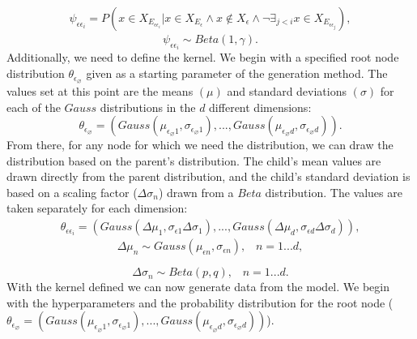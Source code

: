 \documentclass{article}
\begin{document}
%
\begin{equation}
\begin{multlined}
\psi_{\epsilon\epsilon_i} = P(x \in X_{E_{\epsilon\epsilon_i}} | x \in X_{E_\epsilon} \wedge  x \not\in X_\epsilon \wedge \neg \exists_{j < i} x \in X_{E_{\epsilon\epsilon_j}}),
\end{multlined}
\end{equation}
%
\begin{equation}
\psi_{\epsilon\epsilon_i} \sim Beta(1, \gamma).
\end{equation}
%
	Additionally, we need to define the kernel. We begin with a specified root node distribution $\theta_{\epsilon_\varnothing}$ given as a starting parameter of the generation method. The values set at this point are the means $(\mu)$ and standard deviations $(\sigma)$ for each of the $Gauss$ distributions in the $d$ different dimensions:
%
\begin{equation}
\label{eq:theta-epsilon-varnothing}
\theta_{\epsilon_\varnothing} = (Gauss(\mu_{{\epsilon_\varnothing} 1}, \sigma_{{\epsilon_\varnothing} 1}), ... , Gauss(\mu_{{\epsilon_\varnothing} d}, \sigma_{{\epsilon_\varnothing} d})).
\end{equation}
	From there, for any node for which we need the distribution, we can draw the distribution based on the parent's distribution. The child's mean values are drawn directly from the parent distribution, and the child's standard deviation is based on a scaling factor ($\Delta\sigma_n$) drawn from a $Beta$ distribution. The values are taken separately for each dimension:
	\begin{equation}
    \label{eq:theta-epsilon-epsilon-i}
	\begin{multlined}
	\theta_{\epsilon\epsilon_i} = (Gauss(\Delta\mu_1, \sigma_{\epsilon 1} \Delta\sigma_1), ... , Gauss(\Delta\mu_d, \sigma_{\epsilon d} \Delta\sigma_d)),
	\end{multlined}
	\end{equation}
	\begin{equation}
    \label{eq:delta-miu-n}
	\Delta\mu_n \sim Gauss(\mu_{\epsilon n}, \sigma_{\epsilon n}), \;\;\;n = 1 ... d,
	\end{equation}
	
	\begin{equation}
    \label{eq:delta-sigma-n}
	\Delta\sigma_n \sim Beta(p, q), \;\;\;n = 1 ... d.
	\end{equation}
	With the kernel defined we can now generate data from the model. We begin with the hyperparameters and the probability distribution for the root node ($\theta_{\epsilon_\varnothing} = (Gauss(\mu_{\epsilon_\varnothing 1}, \sigma_{\epsilon_\varnothing 1}), ..., Gauss(\mu_{\epsilon_\varnothing d}, \sigma_{\epsilon_\varnothing d}))$).
	
\end{document}
